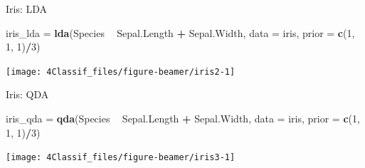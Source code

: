 \documentclass[10pt,ignorenonframetext,]{beamer}
\newenvironment{Shaded}{\begin{snugshade}}{\end{snugshade}}
\newcommand{\KeywordTok}[1]{\textcolor[rgb]{0.13,0.29,0.53}{\textbf{#1}}}
\newcommand{\DataTypeTok}[1]{\textcolor[rgb]{0.13,0.29,0.53}{#1}}
\newcommand{\DecValTok}[1]{\textcolor[rgb]{0.00,0.00,0.81}{#1}}
\newcommand{\StringTok}[1]{\textcolor[rgb]{0.31,0.60,0.02}{#1}}
\newcommand{\OperatorTok}[1]{\textcolor[rgb]{0.81,0.36,0.00}{\textbf{#1}}}
\newcommand{\NormalTok}[1]{#1}
\begin{document}
\begin{frame}[fragile]

\begin{block}{Iris: LDA}

\scriptsize

\begin{Shaded}
\begin{Highlighting}[]
\NormalTok{iris_lda =}\StringTok{ }\KeywordTok{lda}\NormalTok{(Species }\OperatorTok{~}\StringTok{ }\NormalTok{Sepal.Length }\OperatorTok{+}\StringTok{ }\NormalTok{Sepal.Width, }\DataTypeTok{data =}\NormalTok{ iris, }\DataTypeTok{prior =} \KeywordTok{c}\NormalTok{(}\DecValTok{1}\NormalTok{, }
    \DecValTok{1}\NormalTok{, }\DecValTok{1}\NormalTok{)}\OperatorTok{/}\DecValTok{3}\NormalTok{)}
\end{Highlighting}
\end{Shaded}

\begin{center}\texttt{[image: 4Classif\_files/figure-beamer/iris2-1]} \end{center}

\end{block}

\end{frame}

\begin{frame}[fragile]

\begin{block}{Iris: QDA}

\scriptsize

\begin{Shaded}
\begin{Highlighting}[]
\NormalTok{iris_qda =}\StringTok{ }\KeywordTok{qda}\NormalTok{(Species }\OperatorTok{~}\StringTok{ }\NormalTok{Sepal.Length }\OperatorTok{+}\StringTok{ }\NormalTok{Sepal.Width, }\DataTypeTok{data =}\NormalTok{ iris, }\DataTypeTok{prior =} \KeywordTok{c}\NormalTok{(}\DecValTok{1}\NormalTok{, }
    \DecValTok{1}\NormalTok{, }\DecValTok{1}\NormalTok{)}\OperatorTok{/}\DecValTok{3}\NormalTok{)}
\end{Highlighting}
\end{Shaded}

\begin{center}\texttt{[image: 4Classif\_files/figure-beamer/iris3-1]} \end{center}

\end{block}

\end{frame}
\end{document}
